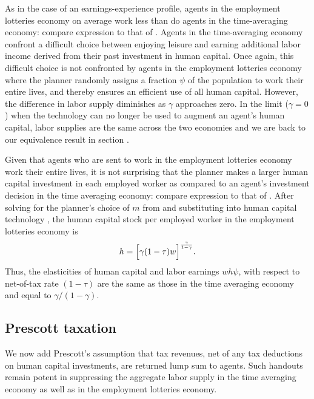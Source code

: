 As in the case of an earnings-experience profile, agents in the
employment lotteries economy on average work less than do agents in
the time-averaging economy: compare expression
 to that of . Agents in the time-averaging
economy confront a difficult choice between enjoying leisure
and earning additional labor income derived from their past investment
in human capital. Once again, this difficult choice is not confronted by  agents in the employment lotteries economy where the planner
randomly assigns a fraction $\psi$ of the population to work their
entire lives, and thereby ensures an efficient use of all human
capital. However, the difference in labor supply diminishes as
$\gamma$ approaches zero.  In the limit ($\gamma =0$) when
the technology can no longer be used to augment an agent's human
capital, labor supplies are the same across the two economies and
we are back to our equivalence result in section .

Given that agents who are sent to work in the employment
lotteries economy work their entire lives, it is not surprising
that the planner makes a larger human capital investment in
each employed worker as compared to an agent's investment
decision in the time averaging economy: compare expression
 to that of .
After solving for the planner's choice of $m$ from
 and substituting into human
capital technology , the human capital
stock per employed worker in the employment lotteries economy
is
$$
h = \Bigl[ \gamma (1-\tau) w\Bigr]^{\gamma \over 1-\gamma }.
$$
Thus, the elasticities  of human capital and
labor earnings $wh\psi $, with respect to net-of-tax rate $(1-\tau )$
are the same as those in the time averaging economy and equal to
$\gamma / (1-\gamma )$.




\subsection{Prescott taxation}\label{sec:LSbenporath_tax}%
We now add Prescott's assumption that tax revenues, net of
any tax deductions on human capital investments, are returned
lump sum to agents. Such handouts remain potent in suppressing the aggregate labor supply in the
time averaging economy as well as in the employment lotteries
economy.


